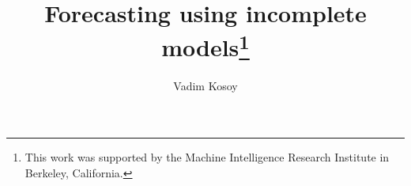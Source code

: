 \newcommand{\B}{\operatorname{B}}

\DeclareMathOperator{\E}{E}
\newcommand{\EE}[2]{\operatorname{E}_{\substack{#1 \\ #2}}}
\newcommand{\EEE}[3]{\operatorname{E}_{\substack{#1 \\ #2 \\ #3}}}

\newcommand{\M}{\xrightarrow{\textnormal{k}}}
\DeclareMathOperator{\Gr}{graph}

\newcommand{\PM}{\mathcal{P}}
\newcommand{\Lp}{{\operatorname{Lip}}}

\DeclareMathOperator{\Sp}{supp}

\newcommand{\DTV}{\operatorname{d}_{\textnormal{TV}}}
\newcommand{\DKR}{\operatorname{d}_{\textnormal{KR}}}

\newcommand{\R}[1]{\N{#1}_{\text{R}}}

\newcommand{\Ob}{\mathcal{O}}
\newcommand{\OO}{\Ob^\omega}
\newcommand{\PO}{\pi^\Ob}
\newcommand{\PMO}{\PM(\OO)}
\newcommand{\MC}{\mathcal{H}}
\newcommand{\Gm}{\mathcal{B}}
\newcommand{\GMO}{\Gm(\OO)}
\newcommand{\CO}{C(\OO)}
\newcommand{\GC}{\mathfrak{G}}
\DeclareMathOperator{\V}{V}
\DeclareMathOperator{\SV}{\Sigma V}
\DeclareMathOperator{\SVM}{\Sigma V_{\min}}
\DeclareMathOperator{\SVX}{\Sigma V_{\max}}
\DeclareMathOperator{\Ab}{A}
\DeclareMathOperator{\Nr}{N}
\newcommand{\Bd}{\Lambda}
\DeclareMathOperator{\PG}{\Gamma}
\newcommand{\BM}{\bm{\mu}}
\newcommand{\F}{\mathcal{F}}
%
%
%
%
%


\title{Forecasting using incomplete models\thanks{This work was supported by the Machine Intelligence Research Institute in Berkeley, California.}
}


\author{Vadim Kosoy}



